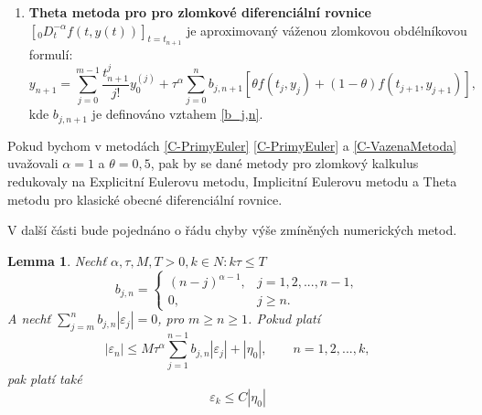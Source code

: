 \documentclass[a4paper,12pt,twoside]{article}
\newtheorem{lem}[veta]{Lemma}
\theoremstyle{definition}
\theoremstyle{remark}
\numberwithin{equation}{section}
\numberwithin{table}{section}
\numberwithin{figure}{section}
\begin{document}
\begin{enumerate}[label=(\textbf{\arabic*})]
	\item \textbf{Theta metoda pro pro zlomkové diferenciální rovnice} 
			$\left[_{0}D_{t}^{-\alpha} f\left(t,y\left(t\right)\right)\right]_{t=t_{n+1}}$ je aproximovaný váženou zlomkovou obdélníkovou formulí:
		\begin{equation} \label{C-VazenaMetoda}
			y_{n+1} = \sum_{j=0}^{m-1} \frac{t_{n+1}^{j}}{j!} y_{0}^{(j)} + \tau^{\alpha} \sum_{j = 0}^{n} 	b_{j,n+1} \left[\theta f\left(t_{j}, y_{j}\right) + \left(1-\theta \right)f \left(t_{j+1}, y_{j+1}\right)\right],
		\end{equation}
		kde $b_{j, n+1}$ je definováno vztahem \eqref{b_j,n}.	%
\end{enumerate}

Pokud bychom v metodách \eqref{C-PrimyEuler} \eqref{C-PrimyEuler} a \eqref{C-VazenaMetoda} uvažovali $\alpha = 1$ a $\theta = 0,5$, pak by se dané metody pro zlomkový kalkulus redukovaly na Explicitní Eulerovu metodu, Implicitní Eulerovu metodu a Theta metodu pro klasické obecné diferenciální rovnice.

V další části bude pojednáno o řádu chyby výše zmíněných numerických metod.

\begin{lem} \label{LemmaOGlobChybe}
	Nechť $\alpha,\tau,M,T > 0, k \in N: k\tau\leq T$
	\begin{equation}
		b_{j,n} =\begin{cases} \left(n-j\right)^{\alpha-1}, & j = 1,2,...,n-1, \\ 0, & j \geq n.\end{cases}
	\end{equation}
	A nechť $\sum_{j=m}^{n} b_{j,n} |\varepsilon_{j}|=0$, pro $m \geq n\geq 1$.
	Pokud platí
	\begin{equation}
		|\varepsilon_{n}| \leq M \tau^{\alpha} \sum_{j = 1}^{n-1} b_{j,n} |\varepsilon_{j}| + |\eta_{0}|, \qquad n = 1,2,...,k,
	\end{equation}
	pak platí také
	\begin{equation}
		\varepsilon_{k}\leq C|\eta_{0}|
	\end{equation}
\end{lem}
\end{document}
